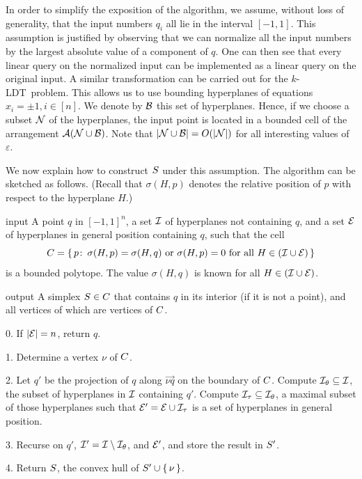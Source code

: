 In order to simplify the exposition of the algorithm, we assume, without
loss of generality, that the input numbers $q_i$ all lie in the interval $[-1,1]$.
This assumption is justified by observing that we can normalize all the input
numbers by the largest absolute value of a component of $q$. One can then see that
every linear query on the normalized input can be implemented
as a linear query on the original input. A similar transformation can be carried out
for the \(k\)-LDT\ problem.
This allows us to use bounding hyperplanes of equations $x_i = \pm 1, i\in [n]$.
We denote by $\mathcal{B}$ this set of hyperplanes. Hence, if we choose a subset
\(\mathcal{N}\) of the hyperplanes, the input point is located in a bounded cell
of the arrangement \(\mathcal{A}(\mathcal{N} \cup \mathcal{B})\). Note that \(|{\mathcal{N} \cup
\mathcal{B}}| = O(|{\mathcal{N}}|)\) for all interesting values of \(\varepsilon\).

We now explain how to construct \(S\) under this assumption. The algorithm
can be sketched as follows. (Recall that $\sigma(H,p)$ denotes the relative position
of $p$ with respect to the hyperplane $H$.)

\begin{algorithm}\label{algo:simplex}
\item[input] A point \(q\) in ${[-1,1]}^n$, a set $\mathcal{I}$ of hyperplanes not
	containing \(q\), and a set $\mathcal{E}$ of hyperplanes in general position
	containing \(q\), such that the cell
	$$
	C = \{\,p \colon\, \sigma(H,p) = \sigma(H,q)
			\ \text{or}\ \sigma(H,p) = 0
			\ \text{for all}\ H \in (\mathcal{I} \cup \mathcal{E})
		\,\}
	$$
	is a bounded polytope. The value \(\sigma(H,q)\) is known for
	all \(H \in (\mathcal{I} \cup \mathcal{E})\). %
\item[output] A simplex \(S \in C\) that contains \(q\) in
	its interior (if it is not a point), and all vertices
	of which are vertices of \(C\).
\item[0.] If $|{\mathcal{E}}|=n$, return $q$.
\item[1.] Determine a vertex \(\nu\) of $C$.
\item[2.] Let \(q'\) be the projection of \(q\) along \(\vec{\nu q}\) on the
	boundary of \(C\). Compute \(\mathcal{I}_\theta \subseteq \mathcal{I}\), the subset of
	hyperplanes in \(\mathcal{I}\) containing \(q'\). Compute \(\mathcal{I}_{\tau} \subseteq
	\mathcal{I}_{\theta}\), a maximal subset of those hyperplanes such that \(\mathcal{E}' = \mathcal{E}
	\cup \mathcal{I}_\tau\) is a set of hyperplanes in general position.
\item[3.] Recurse on \(q'\), \(\mathcal{I}' = \mathcal{I} \setminus \mathcal{I}_\theta\), and \(\mathcal{E}'\), and
	store the result in \(S'\).
\item[4.] Return $S$, the convex hull of \(S' \cup \left\{\,{\nu}\,\right\}\).
\end{algorithm}

